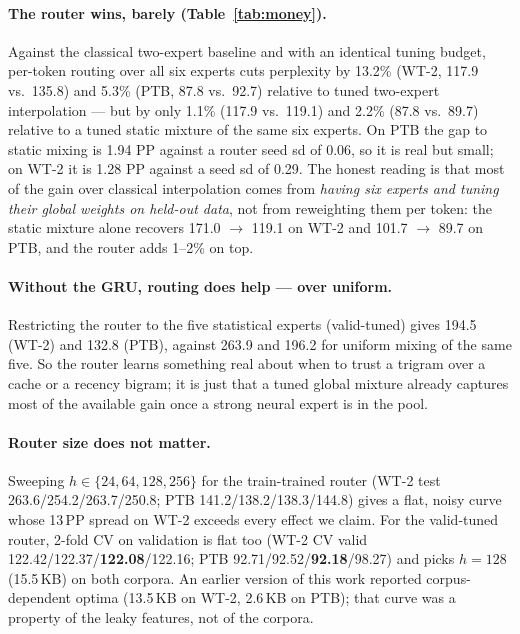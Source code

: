 \documentclass[11pt]{article}
\begin{document}
\paragraph{The router wins, barely (Table~\ref{tab:money}).} Against the
classical two-expert baseline and with an identical tuning budget, per-token
routing over all six experts cuts perplexity by
13.2\% (WT-2, 117.9 vs.\ 135.8) and 5.3\% (PTB, 87.8 vs.\ 92.7) relative to
tuned two-expert interpolation --- but by only 1.1\% (117.9 vs.\ 119.1) and
2.2\% (87.8 vs.\ 89.7) relative to a tuned static mixture of the same six
experts. On PTB the gap to static mixing is 1.94 PP against a router seed sd of
0.06, so it is real but small; on WT-2 it is 1.28 PP against a seed sd of 0.29. The honest reading is that most of the gain over
classical interpolation comes from \emph{having six experts and tuning their
global weights on held-out data}, not from reweighting them per token: the
static mixture alone recovers 171.0 $\rightarrow$ 119.1 on WT-2 and 101.7
$\rightarrow$ 89.7 on PTB, and the router adds 1--2\% on top.

\paragraph{Without the GRU, routing does help --- over uniform.} Restricting
the router to the five statistical experts (valid-tuned) gives 194.5 (WT-2) and
132.8 (PTB), against 263.9 and 196.2 for uniform mixing of the same five. So
the router learns something real about when to trust a trigram over a cache or a
recency bigram; it is just that a tuned global mixture already captures most of
the available gain once a strong neural expert is in the pool.

\paragraph{Router size does not matter.} Sweeping $h \in \{24,64,128,256\}$
for the train-trained router (WT-2 test 263.6/254.2/263.7/250.8; PTB
141.2/138.2/138.3/144.8) gives a flat, noisy curve whose 13\,PP spread on WT-2
exceeds every effect we claim. For the valid-tuned router, 2-fold CV on
validation is flat too (WT-2 CV valid 122.42/122.37/\textbf{122.08}/122.16;
PTB 92.71/92.52/\textbf{92.18}/98.27) and picks $h=128$ (15.5\,KB) on both
corpora. An earlier version of this work reported corpus-dependent optima
(13.5\,KB on WT-2, 2.6\,KB on PTB); that curve was a property of the leaky
features, not of the corpora.
\end{document}
